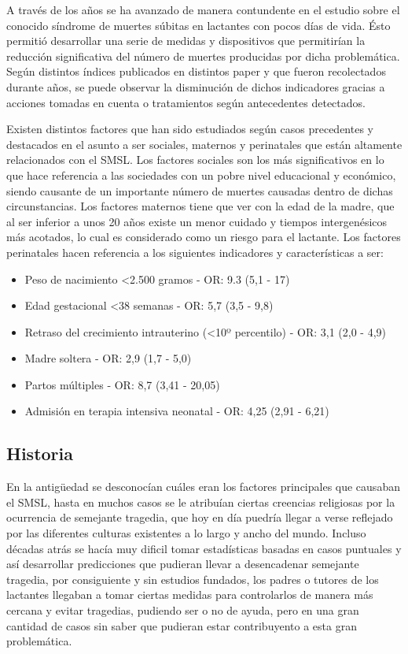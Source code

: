 \documentclass{IEEEtran}
\begin{document}
		A través de los años se ha avanzado de manera contundente en el estudio sobre el conocido síndrome de muertes súbitas en lactantes con pocos días de vida. Ésto permitió desarrollar una serie de medidas y dispositivos que permitirían la reducción significativa del número de muertes producidas por dicha problemática. Según distintos índices publicados en distintos paper y que fueron recolectados durante años, se puede observar la disminución de dichos indicadores gracias a acciones tomadas en cuenta o tratamientos según antecedentes detectados. 

		Existen distintos factores que han sido estudiados según casos precedentes y destacados en el asunto a ser sociales, maternos y perinatales que están altamente relacionados con el SMSL. Los factores sociales son los más significativos en lo que hace referencia a las sociedades con un pobre nivel educacional y económico, siendo causante de un importante número de muertes causadas dentro de dichas circunstancias. Los factores maternos tiene que ver con la edad de la madre, que al ser inferior a unos 20 años existe un menor cuidado y tiempos intergenésicos más acotados, lo cual es considerado como un riesgo para el lactante. Los factores perinatales hacen referencia a los siguientes indicadores y características a ser:
	
		\begin{itemize}
			\item Peso de nacimiento \textless 2.500 gramos - OR: 9.3 (5,1 - 17)
			\item Edad gestacional \textless 38 semanas - OR: 5,7 (3,5 - 9,8)
			\item Retraso del crecimiento intrauterino (\textless 10º percentilo) - OR: 3,1 (2,0 - 4,9)
			\item Madre soltera - OR: 2,9 (1,7 - 5,0)
			\item Partos múltiples - OR: 8,7 (3,41 - 20,05)
			\item Admisión en terapia intensiva neonatal - OR: 4,25 (2,91 - 6,21)
		\end{itemize}

		\subsection{Historia}

			En la antigüedad se desconocían cuáles eran los factores principales que causaban el SMSL, hasta en muchos casos se le atribuían ciertas creencias religiosas por la ocurrencia de semejante tragedia, que hoy en día puedría llegar a verse reflejado por las diferentes culturas existentes a lo largo y ancho del mundo. Incluso décadas atrás se hacía muy dificil tomar estadísticas basadas en casos puntuales y así desarrollar predicciones que pudieran llevar a desencadenar semejante tragedia, por consiguiente y sin estudios fundados, los padres o tutores de los lactantes llegaban a tomar ciertas medidas para controlarlos de manera más cercana y evitar tragedias, pudiendo ser o no de ayuda, pero en una gran cantidad de casos sin saber que pudieran estar contribuyento a esta gran problemática.
\end{document}
